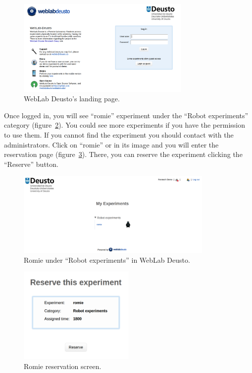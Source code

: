 \begin{figure}[ht]
	\centering
	\includegraphics[width=0.75\textwidth]{fig/manuals/weblab}
	\caption{WebLab Deusto's landing page.}
	\label{fig:man:weblab}
\end{figure}

Once logged in, you will see ``romie'' experiment under the ``Robot experiments'' category
(figure~\ref{fig:man:romie_weblab}). You could see more experiments if you have the permission to
use them. If you cannot find the experiment you should contact with the administrators. Click on
``romie'' or in its image and you will enter the reservation page
(figure~\ref{fig:man:romie_reserve}). There, you can reserve the experiment clicking the ``Reserve''
button.

\begin{figure}[!htbp]
	\centering
	\includegraphics[width=0.85\textwidth]{fig/manuals/trivial/romie-weblab}
	\caption{Romie under ``Robot experiments'' in WebLab Deusto.}
	\label{fig:man:romie_weblab}
\end{figure}

\begin{figure}[!htbp]
	\centering
	\includegraphics[width=0.5\textwidth]{fig/manuals/trivial/romie-reserve}
	\caption{Romie reservation screen.}
	\label{fig:man:romie_reserve}
\end{figure}

